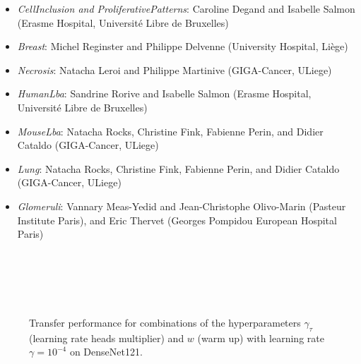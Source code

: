 \begin{itemize}
 \item \textit{CellInclusion and ProliferativePatterns}: Caroline Degand and Isabelle Salmon (Erasme Hospital, Universit\'e Libre de Bruxelles)
 \item \textit{Breast}: Michel Reginster and Philippe Delvenne (University Hospital, Li\`ege) 
 \item \textit{Necrosis}: Natacha Leroi and Philippe Martinive (GIGA-Cancer, ULiege)
 \item \textit{HumanLba}: Sandrine Rorive and Isabelle Salmon (Erasme Hospital, Universit\'e Libre de Bruxelles) 
 \item \textit{MouseLba}: Natacha Rocks, Christine Fink, Fabienne Perin, and Didier Cataldo (GIGA-Cancer, ULiege) 
 \item \textit{Lung}: 
Natacha Rocks, Christine Fink, Fabienne Perin, and Didier Cataldo (GIGA-Cancer, ULiege) 
 \item \textit{Glomeruli}: Vannary Meas-Yedid and Jean-Christophe Olivo-Marin (Pasteur Institute Paris), and Eric Thervet (Georges Pompidou European Hospital Paris)
\end{itemize}



\begin{figure*}[h]
    \centering
{}
\\
\\
\\
\\
    \caption{Transfer performance for combinations of the hyperparameters $\gamma_\tau$ (learning rate heads multiplier) and $w$ (warm up) with learning rate $\gamma = 10^{-4}$ on DenseNet121.}
    \label{app:mtask:fig:app:bar_lrhm_densenet}
\end{figure*}


